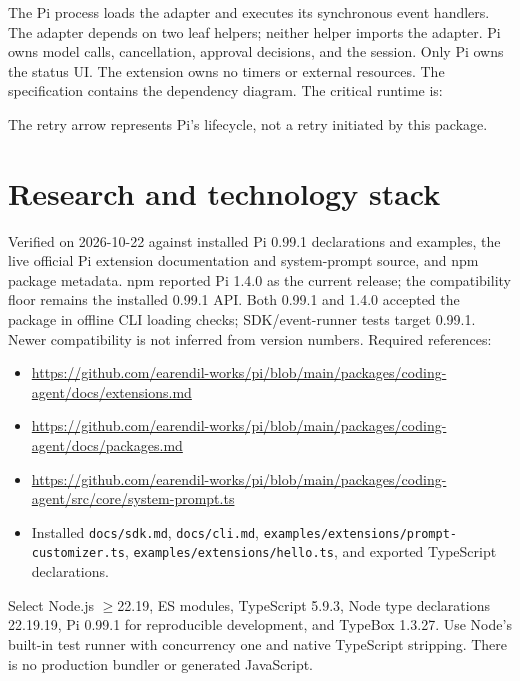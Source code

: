 \documentclass[10pt]{ltjsarticle}
\begin{document}
The Pi process loads the adapter and executes its synchronous event handlers.
The adapter depends on two leaf helpers; neither helper imports the adapter.
Pi owns model calls, cancellation, approval decisions, and the session.
Only Pi owns the status UI. The extension owns no timers or external resources.
The specification contains the dependency diagram. The critical runtime is:
\begin{center}
\end{center}
The retry arrow represents Pi's lifecycle, not a retry initiated by this package.

\section{Research and technology stack}
Verified on 2026-10-22 against installed Pi 0.99.1 declarations and examples,
the live official Pi extension documentation and system-prompt source, and npm
package metadata. npm reported Pi 1.4.0 as the current release; the compatibility
floor remains the installed 0.99.1 API. Both 0.99.1 and 1.4.0 accepted the
package in offline CLI loading checks; SDK/event-runner tests target 0.99.1.
Newer compatibility is not inferred from version numbers. Required references:
\begin{itemize}
\item \url{https://github.com/earendil-works/pi/blob/main/packages/coding-agent/docs/extensions.md}
\item \url{https://github.com/earendil-works/pi/blob/main/packages/coding-agent/docs/packages.md}
\item \url{https://github.com/earendil-works/pi/blob/main/packages/coding-agent/src/core/system-prompt.ts}
\item Installed \texttt{docs/sdk.md}, \texttt{docs/cli.md},
\texttt{examples/extensions/prompt-customizer.ts},
\texttt{examples/extensions/hello.ts}, and exported TypeScript declarations.
\end{itemize}
Select Node.js $\geq$22.19, ES modules, TypeScript 5.9.3, Node type declarations
22.19.19, Pi 0.99.1 for reproducible development, and TypeBox 1.3.27. Use Node's
built-in test runner with concurrency one and native TypeScript stripping.
There is no production bundler or generated JavaScript.
\end{document}
